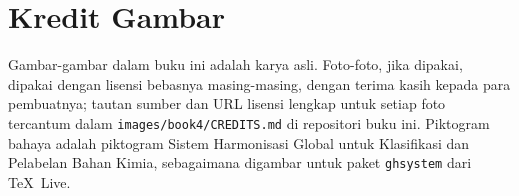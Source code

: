 \chapter*{Kredit Gambar}

Gambar-gambar dalam buku ini adalah karya asli. Foto-foto, jika dipakai,
dipakai dengan lisensi bebasnya masing-masing, dengan terima kasih kepada
para pembuatnya; tautan sumber dan URL lisensi lengkap untuk setiap foto
tercantum dalam \texttt{images/book4/CREDITS.md} di repositori buku ini.
Piktogram bahaya adalah piktogram Sistem Harmonisasi Global untuk
Klasifikasi dan Pelabelan Bahan Kimia, sebagaimana digambar untuk paket
\texttt{ghsystem} dari \TeX\ Live.

